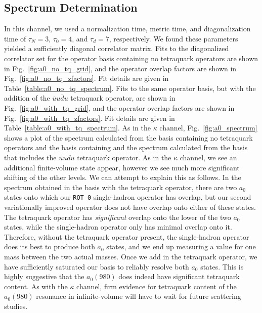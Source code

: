 \subsection{Spectrum Determination}
In this channel, we used a normalization time, metric time, and diagonalization time of $\tau_N=3$, $\tau_0=4$, and $\tau_d=7$, respectively. We found these parameters yielded a sufficiently diagonal correlator matrix. Fits to the diagonalized correlator set for the operator basis containing no tetraquark operators are shown in Fig.~\ref{fig:a0_no_tq_grid}, and the operator overlap factors are shown in Fig.~\ref{fig:a0_no_tq_zfactors}. Fit details are given in Table~\ref{table:a0_no_tq_spectrum}. Fits to the same operator basis, but with the addition of the $\overline u u \overline d u$ tetraquark operator, are shown in Fig.~\ref{fig:a0_with_tq_grid}, and the operator overlap factors are shown in Fig.~\ref{fig:a0_with_tq_zfactors}. Fit details are given in Table~\ref{table:a0_with_tq_spectrum}. As in the $\kappa$ channel, Fig.~\ref{fig:a0_spectrum} shows a plot of the spectrum calculated from the basis containing no tetraquark operators and the basis containing and the spectrum calculated from the basis that includes the $\overline u u \overline d u$ tetraquark operator. As in the $\kappa$ channel, we see an additional finite-volume state appear, however we see much more significant shifting of the other levels. We can attempt to explain this as follows. In the spectrum obtained in the basis with the tetraquark operator, there are two $a_0$ states onto which our \verb+ROT 0+ single-hadron operator has overlap, but our second variationally improved operator does not have overlap onto either of these states. The tetraquark operator has \emph{significant} overlap onto the lower of the two $a_0$ states, while the single-hadron operator only has minimal overlap onto it. Therefore, without the tetraquark operator present, the single-hadron operator does its best to produce both $a_0$ states, and we end up measuring a value for one mass between the two actual masses. Once we add in the tetraquark operator, we have sufficiently saturated our basis to reliably resolve both $a_0$ states. This is highly suggestive that the $a_0(980)$ does indeed have significant tetraquark content. As with the $\kappa$ channel, firm evidence for tetraquark content of the $a_0(980)$ resonance in infinite-volume will have to wait for future scattering studies.
